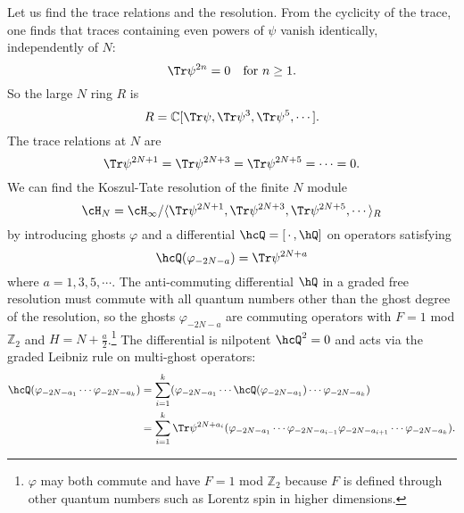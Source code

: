 \documentclass[a4paper,12pt]{article}
\begin{document}
Let us find the trace relations and the resolution. From the cyclicity of the trace, one finds that traces containing even powers of $\psi$ vanish identically, independently of $N$:
\begin{equation}
\Tr \psi^{2n} = 0 \quad \mathrm{for} \ n\geq 1.
\end{equation}
So the large $N$ ring $R$ is
\begin{equation}
R = \mathbb{C}[\Tr \psi, \Tr \psi^3, \Tr \psi^5, \cdots].
\end{equation}
The trace relations at $N$ are
\begin{equation}
\Tr \psi^{2N + 1} = \Tr \psi^{2N + 3} = \Tr \psi^{2N + 5} = \cdots = 0.
\end{equation}
We can find the Koszul-Tate resolution of the finite $N$ module
\begin{equation}
\cH_N = \cH_\infty / \langle \Tr \psi^{2N + 1}, \Tr \psi^{2N + 3}, \Tr \psi^{2N + 5}, \cdots \rangle_R
\end{equation}
by introducing ghosts $\varphi$ and a differential $\hcQ = [\,\cdot\,,\hQ]$ on operators satisfying
\begin{equation}
\hcQ (\varphi_{-2N- a} ) = \Tr \psi^{2N + a}
\end{equation}
where $a = 1,3,5, \cdots$. The anti-commuting differential $\hQ$ in a graded free resolution must commute with all quantum numbers other than the ghost degree of the resolution, so the ghosts $\varphi_{-2N -a}$ are commuting operators with $F = 1$ mod $\mathbb{Z}_2$ and $H = N + \frac{a}{2}$.\footnote{$\varphi$ may both commute and have $F = 1$ mod $\mathbb{Z}_2$ because $F$ is defined through other quantum numbers such as Lorentz spin in higher dimensions.} The differential is nilpotent $\hcQ^2 = 0$ and acts via the graded Leibniz rule on multi-ghost operators:
\begin{align}
    \hcQ ( \varphi_{-2N-a_1} \cdots \varphi_{-2N-a_k}) &= \sum_{i=1}^k ( \varphi_{-2N-a_1} \cdots \hcQ(\varphi_{-2N-a_1}) \cdots \varphi_{-2N-a_k} ) \nonumber \\
    &= \sum_{i=1}^k \Tr \psi^{2N + a_i} ( \varphi_{-2N-a_1} \cdots \varphi_{-2N-a_{i-1}} \varphi_{-2N-a_{i+1}} \cdots \varphi_{-2N-a_k} ).
\end{align}
\end{document}
